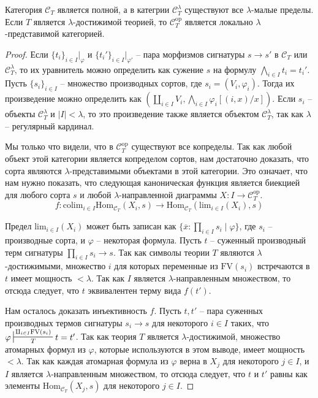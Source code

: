 \documentclass[reqno]{amsart}
\theoremstyle{definition}
\theoremstyle{remark}
\newcommand{\cat}[1]{\mathcal{#1}}
\newcommand{\fs}[1]{\mathrm{#1}}
\newcommand{\Hom}{\fs{Hom}}
\newcommand{\FV}{\fs{FV}}
\newcommand{\colim}{\fs{colim}}
\begin{document}
\begin{prop}
Категория $\cat{C}_T$ является полной, а в категрии $\cat{C}_T^\lambda$ существуют все $\lambda$-малые пределы.
Если $T$ является $\lambda$-достижимой теорией, то $\cat{C}_T^\fs{op}$ является локально $\lambda$-представимой категорией.
\end{prop}
\begin{proof}
Если $\{ t_i \}_{i \in I}|_\varphi$ и $\{ t_i' \}_{i \in I}|_{\varphi'}$ -- пара морфизмов сигнатуры $s \to s'$ в $\cat{C}_T$ или $\cat{C}_T^\lambda$,
то их уравнитель можно определить как сужение $s$ на формулу $\bigwedge_{i \in I} t_i = t_i'$.
Пусть $\{ s_i \}_{i \in I}$ -- множество производных сортов, где $s_i = (V_i,\varphi_i)$.
Тогда их произведение можно определить как $(\coprod_{i \in I} V_i, \bigwedge_{i \in I} \varphi_i[(i,x)/x])$.
Если $s_i$ -- объекты $\cat{C}_T^\lambda$ и $|I| < \lambda$, то это произведение также является объектом $\cat{C}_T^\lambda$, так как $\lambda$ -- регулярный кардинал.

Мы только что видели, что в $\cat{C}_T^\fs{op}$ существуют все копределы.
Так как любой объект этой категории является копределом сортов, нам достаточно доказать, что сорта являются $\lambda$-представимыми объектами в этой категории.
Это означает, что нам нужно показать, что следующая каноническая функция является биекцией для любого сорта $s$ и любой $\lambda$-направленной диаграммы $X : I \to \cat{C}_T^\fs{op}$.
\[ f : \colim_{i \in I} \Hom_{\cat{C}_T}(X_i, s) \to \Hom_{\cat{C}_T}(\fs{lim}_{i \in I}(X_i), s) \]

Предел $\fs{lim}_{i \in I}(X_i)$ может быть записан как $\{ \overline{x} : \prod_{i \in I} s_i \mid \varphi \}$, где $s_i$ -- производные сорта, и $\varphi$ -- некоторая формула.
Пусть $t$ -- суженный производный терм сигнатуры $\prod_{i \in I} s_i \to s$.
Так как символы теории $T$ являются $\lambda$-достижимыми, множество $i$ для которых переменные из $\FV(s_i)$ встречаются в $t$ имеет мощность $< \lambda$.
Так как $I$ является $\lambda$-направленным множеством, то отсюда следует, что $t$ эквивалентен терму вида $f(t')$.

Нам осталось доказать инъективность $f$.
Пусть $t,t'$ -- пара суженных производных термов сигнатуры $s_i \to s$ для некоторого $i \in I$ таких, что $\varphi \sststile{T}{\amalg_{i \in I} \FV(s_i)} t = t'$.
Так как теория $T$ является $\lambda$-достижимой, множество атомарных формул из $\varphi$, которые используются в этом выводе, имеет мощность $< \lambda$.
Так как каждая атомарная формула из $\varphi$ верна в $X_j$ для некоторого $j \in I$, и $I$ является $\lambda$-направленным множеством, то отсюда следует, что $t$ и $t'$ равны как элементы $\Hom_{\cat{C}_T}(X_j, s)$ для некоторого $j \in I$.
\end{proof}
\end{document}
